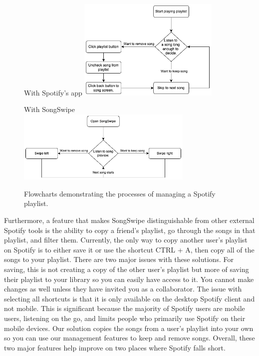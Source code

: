 \documentclass{article}
\begin{document}
\begin{figure}[h]
    \centering
    \begin{subcaptionbox}{With Spotify's app\label{fig:diagram1}}
        {\includegraphics[width=0.60\textwidth]{./flow1.png}}
    \end{subcaptionbox}
    \hspace{1em} %
    \begin{subcaptionbox}{With SongSwipe\label{fig:diagram2}}
        {\includegraphics[width=0.75\textwidth]{./flow2.png}}
    \end{subcaptionbox}
    \caption{Flowcharts demonstrating the processes of managing a Spotify playlist.}
    \label{fig:both_diagrams}
\end{figure}

\quad Furthermore, a feature that makes SongSwipe distinguishable from other external Spotify tools is the ability to copy a friend’s playlist, go through the songs in that playlist, and filter them. Currently, the only way to copy another user’s playlist on Spotify is to either save it or use the shortcut CTRL + A, then copy all of the songs to your playlist. There are two major issues with these solutions. For saving, this is not creating a copy of the other user’s playlist but more of saving their playlist to your library so you can easily have access to it. You cannot make changes as well unless they have invited you as a collaborator. The issue with selecting all shortcuts is that it is only available on the desktop Spotify client and not mobile. This is significant because the majority of Spotify users are mobile users, listening on the go, and limits people who primarily use Spotify on their mobile devices. Our solution copies the songs from a user’s playlist into your own so you can use our management features to keep and remove songs. Overall, these two major features help improve on two places where Spotify falls short.
\end{document}
